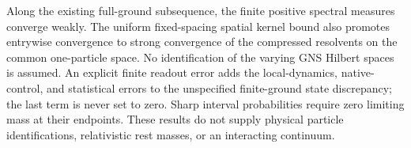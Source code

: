 Along the existing full-ground subsequence, the finite positive spectral
measures converge weakly.  The uniform fixed-spacing spatial kernel bound
also promotes entrywise convergence to strong convergence of the
compressed resolvents on the common one-particle space.  No identification
of the varying GNS Hilbert spaces is assumed.  An explicit finite readout
error adds the local-dynamics, native-control, and statistical errors to
the unspecified finite-ground state discrepancy; the last term is
never set to zero.  Sharp interval probabilities require zero limiting
mass at their endpoints.  These results do not supply physical particle
identifications, relativistic rest masses, or an interacting continuum.
